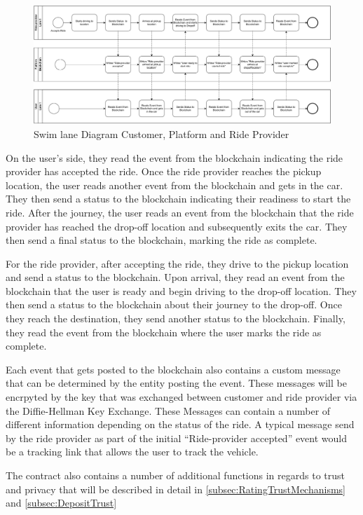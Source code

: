 \begin{figure}[h]
    \centering
    \includegraphics[width=\linewidth]{data/1.svg}
    \caption{Swim lane Diagram Customer, Platform and Ride Provider}
    \label{fig:SwimLaneCustomer}
\end{figure}

On the user's side, they read the event from the blockchain indicating the ride provider has accepted the ride. Once the ride provider reaches the pickup location, the user reads another event from the blockchain and gets in the car. They then send a status to the blockchain indicating their readiness to start the ride. After the journey, the user reads an event from the blockchain that the ride provider has reached the drop-off location and subsequently exits the car. They then send a final status to the blockchain, marking the ride as complete.

For the ride provider, after accepting the ride, they drive to the pickup location and send a status to the blockchain. Upon arrival, they read an event from the blockchain that the user is ready and begin driving to the drop-off location. They then send a status to the blockchain about their journey to the drop-off. Once they reach the destination, they send another status to the blockchain. Finally, they read the event from the blockchain where the user marks the ride as complete.

Each event that gets posted to the blockchain also contains a custom message that can be determined by the entity posting the event. These messages will be encrpyted by the key that was exchanged between customer and ride provider via the Diffie-Hellman Key Exchange. These Messages can contain a number of different information depending on the status of the ride. A typical message send by the ride provider as part of the initial ``Ride-provider accepted'' event would be a tracking link that allows the user to track the vehicle. 

The contract also contains a number of additional functions in regards to trust and privacy that will be described in detail in \ref{subsec:RatingTrustMechanisms} and \ref{subsec:DepositTrust}

